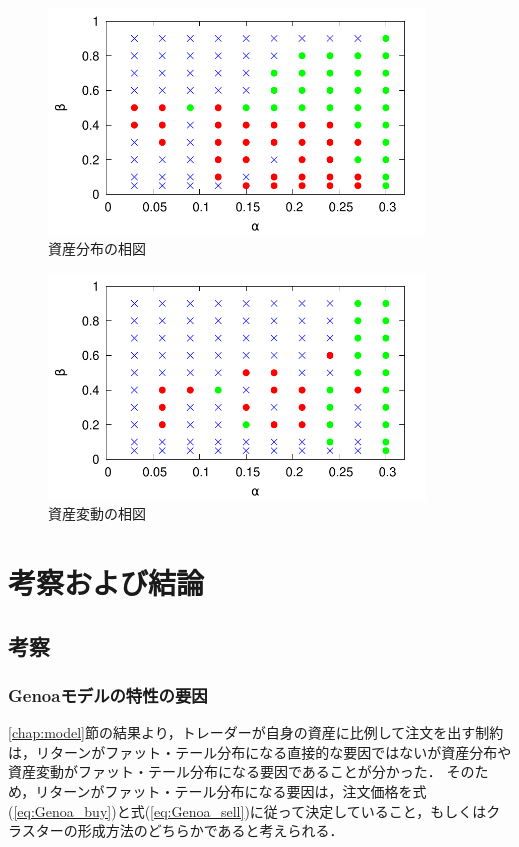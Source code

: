\documentclass[titlepage]{jsreport}
\begin{document}
\begin{figure}
    \centering
    \includegraphics[width=10cm]{fig/signal.pdf}
    \caption{資産分布の相図}
    \label{fig:signal_asset}
\end{figure}

\begin{figure}
    \centering
    \includegraphics[width=10cm]{fig/signal/signal_asset_growth.pdf}
    \caption{資産変動の相図}
    \label{fig:signal_asset_growth}
\end{figure}


\chapter{考察および結論} \label{chap:summary}
\section{考察}
\subsection{Genoaモデルの特性の要因}
\ref{chap:model}節の結果より，トレーダーが自身の資産に比例して注文を出す制約は，リターンがファット・テール分布になる直接的な要因ではないが資産分布や資産変動がファット・テール分布になる要因であることが分かった．
そのため，リターンがファット・テール分布になる要因は，注文価格を式(\ref{eq:Genoa_buy})と式(\ref{eq:Genoa_sell})に従って決定していること，もしくはクラスターの形成方法のどちらかであると考えられる．
\end{document}
